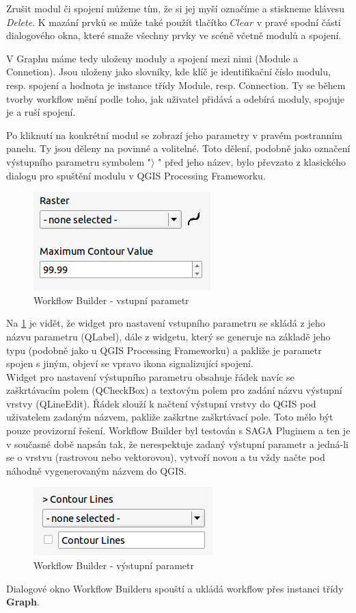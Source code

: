 Zrušit modul či spojení můžeme tím, že si jej myší označíme a stiskneme klávesu \textit{Delete}. K mazání prvků se může také použít tlačítko $Clear$ v pravé spodní části dialogového okna, které smaže všechny prvky ve scéně včetně modulů a spojení.

V Graphu máme tedy uloženy moduly a spojení mezi nimi (Module a Connetion). Jsou uloženy jako slovníky, kde klíč je identifikační číslo modulu, resp. spojení a hodnota je instance třídy Module, resp. Connection. Ty se během tvorby workflow mění podle toho, jak uživatel přidává a odebírá moduly, spojuje je a ruší spojení.


Po kliknutí na konkrétní modul se zobrazí jeho parametry v pravém postranním panelu. Ty jsou děleny na povinné a volitelné. Toto dělení, podobně jako označení výstupního parametru symbolem "$\rangle$ " před jeho název, bylo převzato z klasického dialogu pro spuštění modulu v QGIS Processing Frameworku. \\

\begin{figure}[h]
	\centering
	\includegraphics[scale=0.9]{pictures/wf/wf_inPar}
	\caption{Workflow Builder - vstupní parametr}
  	\label{wf:inPar}
\end{figure}

Na \figurename \ref{wf:inPar} je vidět, že widget pro nastavení vstupního parametru se skládá z jeho názvu parametru (QLabel), dále z widgetu, který se generuje na základě jeho typu (podobně jako u QGIS Processing Frameworku) a pakliže je parametr spojen s jiným, objeví se vpravo ikona signalizující spojení. \\

Widget pro nastavení výstupního parametru obsahuje řádek navíc se zaškrtávacím polem (QCheckBox) a textovým polem pro zadání názvu výstupní vrstvy (QLineEdit). Řádek slouží k načtení výstupní vrstvy  do QGIS pod uživatelem zadaným názvem, pakliže zaškrtne zaškrtávací pole. Toto mělo být pouze provizorní řešení. Workflow Builder byl testován s SAGA Pluginem a ten je v současné době napsán tak, že nerespektuje zadaný výstupní parametr a jedná-li se o vrstvu (rastrovou nebo vektorovou), vytvoří novou a tu vždy načte pod náhodně vygenerovaným názvem do QGIS. \\

\begin{figure}[!]
	\centering
	\includegraphics[scale=1.0]{pictures/wf/wf_outPar}
	\caption{Workflow Builder - výstupní parametr}
  	\label{wf:outPar}
\end{figure}


Dialogové okno Workflow Builderu spouští a ukládá workflow přes instanci třídy \textbf{Graph}. 